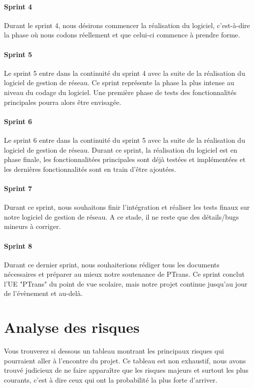 \documentclass[french]{article}
\begin{document}
\paragraph{Sprint 4}
Durant le sprint 4, nous désirons commencer la réalisation du logiciel, c'est-à-dire la phase où nous codons réellement et que celui-ci commence à prendre forme.

\paragraph{Sprint 5}
Le sprint 5 entre dans la continuité du sprint 4 avec la suite de la réalisation du logiciel de gestion de réseau. 
Ce sprint représente la phase la plus intense au niveau du codage du logiciel.
Une première phase de tests des fonctionnalités principales pourra alors être envisagée.

\paragraph{Sprint 6}
Le sprint 6 entre dans la continuité du sprint 5 avec la suite de la réalisation du logiciel de gestion de réseau.
Durant ce sprint, la réalisation du logiciel est en phase finale, les fonctionnalitées principales sont déjà testées et implémentées et les dernières fonctionnalités sont en train d'être ajoutées.

\paragraph{Sprint 7}
Durant ce sprint, nous souhaitons finir l'intégration et réaliser les tests finaux sur notre logiciel de gestion de réseau.
A ce stade, il ne reste que des détails/bugs mineurs à corriger.

\paragraph{Sprint 8}
Durant ce dernier sprint, nous souhaiterions rédiger tous les documents nécessaires et préparer au mieux notre soutenance de PTrans.
Ce sprint conclut l'UE "PTrans" du point de vue scolaire, mais notre projet continue jusqu'au jour de l'évènement et au-delà.

\section{Analyse des risques}

Vous trouverez si dessous un tableau montrant les principaux risques qui pourraient aller à l'encontre du projet. Ce tableau est non exhaustif, nous avons trouvé judicieux de ne faire apparaître que les risques majeurs et surtout les plus courants, c'est à dire ceux qui ont la probabilité la plus forte d'arriver.
\end{document}
